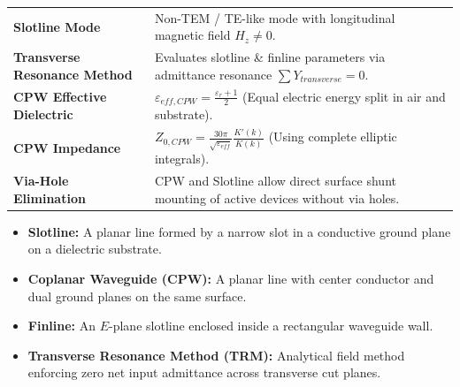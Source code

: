 \documentclass[12pt,a4paper]{article}
\renewcommand{\arraystretch}{1.45}
\begin{document}
\begin{tcolorbox}[formulabox, title={\textbf{Key Concepts and Metrics at a Glance}}]
\renewcommand{\arraystretch}{1.35}
\begin{tabularx}{\linewidth}{>{\raggedright\arraybackslash\bfseries}p{4.5cm} X}
Slotline Mode & Non-TEM / TE-like mode with longitudinal magnetic field $H_z \ne 0$. \\[4pt]
Transverse Resonance Method & Evaluates slotline \& finline parameters via admittance resonance $\sum Y_{transverse} = 0$. \\[4pt]
CPW Effective Dielectric & $\varepsilon_{eff,CPW} = \frac{\varepsilon_r+1}{2}$ \quad (Equal electric energy split in air and substrate). \\[4pt]
CPW Impedance & $Z_{0,CPW} = \frac{30\pi}{\sqrt{\varepsilon_{eff}}} \frac{K'(k)}{K(k)}$ \quad (Using complete elliptic integrals). \\[4pt]
Via-Hole Elimination & CPW and Slotline allow direct surface shunt mounting of active devices without via holes. \\
\end{tabularx}
\end{tcolorbox}

\begin{tcolorbox}[defbox, title={\textbf{One-Line Definitions}}]
  \begin{itemize}[leftmargin=*, noitemsep]
    \item \textbf{Slotline:} A planar line formed by a narrow slot in a conductive ground plane on a dielectric substrate.
    \item \textbf{Coplanar Waveguide (CPW):} A planar line with center conductor and dual ground planes on the same surface.
    \item \textbf{Finline:} An $E$-plane slotline enclosed inside a rectangular waveguide wall.
    \item \textbf{Transverse Resonance Method (TRM):} Analytical field method enforcing zero net input admittance across transverse cut planes.
  \end{itemize}
\end{tcolorbox}
\end{document}
